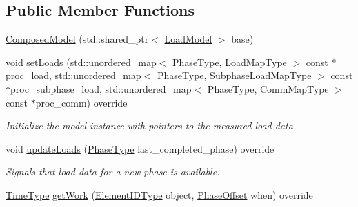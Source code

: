 \subsection*{Public Member Functions}
\begin{DoxyCompactItemize}
\item 
\hyperlink{classvt_1_1vrt_1_1collection_1_1balance_1_1_composed_model_a84b77c1fceb9e07a0706b896a4d9e9c9}{Composed\+Model} (std\+::shared\+\_\+ptr$<$ \hyperlink{classvt_1_1vrt_1_1collection_1_1balance_1_1_load_model}{Load\+Model} $>$ base)
\item 
void \hyperlink{classvt_1_1vrt_1_1collection_1_1balance_1_1_composed_model_a2f9013d1f135574a03fe5de70ac11862}{set\+Loads} (std\+::unordered\+\_\+map$<$ \hyperlink{namespacevt_a46ce6733d5cdbd735d561b7b4029f6d7}{Phase\+Type}, \hyperlink{namespacevt_1_1vrt_1_1collection_1_1balance_a45306ee4bf38fe3fb586d1ee2fa3d147}{Load\+Map\+Type} $>$ const $\ast$proc\+\_\+load, std\+::unordered\+\_\+map$<$ \hyperlink{namespacevt_a46ce6733d5cdbd735d561b7b4029f6d7}{Phase\+Type}, \hyperlink{namespacevt_1_1vrt_1_1collection_1_1balance_a3d91523158c1025b7b665240072f3b7e}{Subphase\+Load\+Map\+Type} $>$ const $\ast$proc\+\_\+subphase\+\_\+load, std\+::unordered\+\_\+map$<$ \hyperlink{namespacevt_a46ce6733d5cdbd735d561b7b4029f6d7}{Phase\+Type}, \hyperlink{namespacevt_1_1vrt_1_1collection_1_1balance_a10860c956804d644db54a16012352728}{Comm\+Map\+Type} $>$ const $\ast$proc\+\_\+comm) override
\begin{DoxyCompactList}\small\item\em Initialize the model instance with pointers to the measured load data. \end{DoxyCompactList}\item 
void \hyperlink{classvt_1_1vrt_1_1collection_1_1balance_1_1_composed_model_ad8108b4392d63b7f09e443920a64933a}{update\+Loads} (\hyperlink{namespacevt_a46ce6733d5cdbd735d561b7b4029f6d7}{Phase\+Type} last\+\_\+completed\+\_\+phase) override
\begin{DoxyCompactList}\small\item\em Signals that load data for a new phase is available. \end{DoxyCompactList}\item 
\hyperlink{namespacevt_a876a9d0cd5a952859c72de8a46881442}{Time\+Type} \hyperlink{classvt_1_1vrt_1_1collection_1_1balance_1_1_composed_model_a5de9a43648cfd18ca00f1f0a6c61be4d}{get\+Work} (\hyperlink{namespacevt_1_1vrt_1_1collection_1_1balance_a14c8d2c972f2913aa3f1636e5be0a120}{Element\+I\+D\+Type} object, \hyperlink{structvt_1_1vrt_1_1collection_1_1balance_1_1_phase_offset}{Phase\+Offset} when) override

\end{DoxyCompactItemize}
